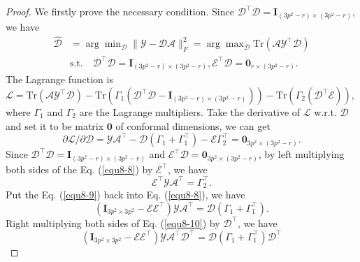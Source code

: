 \begin{proof}
We firstly prove the necessary condition.
Since $\mathcal{D}^{\top}\mathcal{D} = \bm{I}_{(3p^2-r)\times (3p^2-r)}$, we have
\begin{equation}
\label{equ8-7}
\begin{split}
\hat{\mathcal{D}}
&
=
\arg\min\nolimits_{\mathcal{D}}\|\mathcal{Y}-\mathcal{D}\mathcal{A}\|_{F}^{2}
=
\arg\max\nolimits_{\mathcal{D}}\text{Tr}(\mathcal{A}\mathcal{Y}^{\top}\mathcal{D})
\\
&
\text{s.t.}
\quad
\mathcal{D}^{\top}\mathcal{D} = \bm{I}_{(3p^2-r)\times (3p^2-r)}, \mathcal{E}^{\top}\mathcal{D} = \bm{0}_{r\times (3p^2-r)}.
\end{split}
\end{equation}
The Lagrange function is
$
\mathcal{L}
=
\text{Tr}(\mathcal{A}\mathcal{Y}^{\top}\mathcal{D})
-
\text{Tr}(\Gamma_{1}(\mathcal{D}^{\top}\mathcal{D} - \bm{I}_{(3p^2-r)\times (3p^2-r)}))
-
\text{Tr}(\Gamma_{2}(\mathcal{D}^{\top}\mathcal{E}))
$,
where $\Gamma_{1}$ and $\Gamma_{2}$ are the Lagrange multipliers. Take the derivative of $\mathcal{L}$ w.r.t. $\mathcal{D}$ and set it to be matrix $\bm{0}$ of conformal dimensions, we can get
\begin{equation}
\label{equ8-8}
\partial\mathcal{L}/\partial\mathcal{D} 
=
\mathcal{Y}\mathcal{A}^{\top}
-
\mathcal{D}(\Gamma_{1}+\Gamma_{1}^{\top})
-
\mathcal{E}\Gamma_{2}^{\top}
=
\bm{0}_{3p^2\times (3p^2-r)}.
\end{equation}
Since $\mathcal{D}^{\top}\mathcal{D}=\bm{I}_{(3p^2-r)\times (3p^2-r)}$ and $\mathcal{E}^{\top}\mathcal{D} = \bm{0}_{3p^2\times (3p^2-r)}$, by left multiplying both sides of the Eq. (\ref{equ8-8}) by $\mathcal{E}^{\top}$, we have 
\begin{equation}
\label{equ8-9}
\mathcal{E}^{\top}\mathcal{Y}\mathcal{A}^{\top}
=
\Gamma_{2}^{\top}.
\end{equation}
Put the Eq. (\ref{equ8-9}) back into Eq. (\ref{equ8-8}), we have 
\begin{equation}
\label{equ8-10}
(\bm{I}_{3p^2\times 3p^2}-\mathcal{E}\mathcal{E}^{\top})\mathcal{Y}\mathcal{A}^{\top}
=
\mathcal{D}(\Gamma_{1}+\Gamma_{1}^{\top}).
\end{equation}
Right multiplying both sides of Eq. (\ref{equ8-10}) by $\mathcal{D}^{\top}$, we have
\begin{equation}
\label{equ8-11}
(\bm{I}_{3p^2\times 3p^2}-\mathcal{E}\mathcal{E}^{\top})\mathcal{Y}\mathcal{A}^{\top}\mathcal{D}^{\top}
=
\mathcal{D}(\Gamma_{1}+\Gamma_{1}^{\top})\mathcal{D}^{\top}

\end{equation}
\end{proof}
